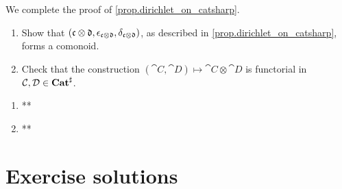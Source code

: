 \documentclass[Book-Poly]{subfiles}
\begin{document}
\begin{exercise}\label{exc.dirichlet_on_catsharp}
We complete the proof of \cref{prop.dirichlet_on_catsharp}.
\begin{enumerate}
	\item Show that $(\mathfrak{c}\otimes\mathfrak{d},\epsilon_{\mathfrak{c}\otimes\mathfrak{d}},\delta_{\mathfrak{c}\otimes\mathfrak{d}})$, as described in \cref{prop.dirichlet_on_catsharp}, forms a comonoid.
	\item Check that the construction $(\cat{C},\cat{D})\mapsto\cat{C}\otimes\cat{D}$ is functorial in $\mathcal{C},\mathcal{D}\in\mathbf{Cat}^\sharp$.
\qedhere
\end{enumerate}
\begin{solution}
\begin{enumerate}
    \item **
    \item **
\end{enumerate}
\end{solution}
\end{exercise}



\section{Exercise solutions}
{\footnotesize
}
\end{document}
